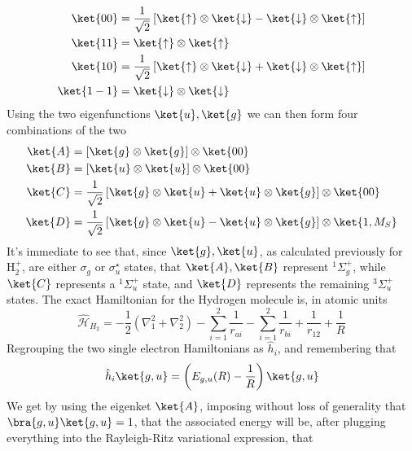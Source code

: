 \documentclass[a4paper, 11pt]{book}
\newcommand{\1}{\opr{\mathds{1}}}
\newcommand{\ham}{\mathcal{H}}
\newcommand{\opr}[1]{\hat{#1}}
\newcommand{\up}{\uparrow}
\newcommand{\down}{\downarrow}
\newcommand{\term}[3][]{^{#3}#2_{#1}}
\theoremstyle{plain}
\begin{document}
	\begin{equation}
		\begin{aligned}
			\ket{00}&=\frac{1}{\sqrt{2}}\left[ \ket{\up}\otimes\ket{\down}-\ket{\down}\otimes\ket{\up} \right]\\
			\ket{11}&=\ket{\up}\otimes\ket{\up}\\
			\ket{10}&=\frac{1}{\sqrt{2}}\left[ \ket{\up}\otimes\ket{\down}+\ket{\down}\otimes\ket{\up} \right]\\
			\ket{1-1}&=\ket{\down}\otimes\ket{\down}
		\end{aligned}
		\label{eq:eigenspinorsh2}
	\end{equation}
	Using the two eigenfunctions $\ket{u},\ket{g}$ we can then form four combinations of the two
	\begin{equation}
		\begin{aligned}
			\ket{A}&=\left[ \ket{g}\otimes\ket{g} \right]\otimes\ket{00}\\
			\ket{B}&=\left[ \ket{u}\otimes\ket{u} \right]\otimes\ket{00}\\
			\ket{C}&=\frac{1}{\sqrt{2}}\left[ \ket{g}\otimes\ket{u}+\ket{u}\otimes\ket{g} \right]\otimes\ket{00}\\
			\ket{D}&=\frac{1}{\sqrt{2}}\left[ \ket{g}\otimes\ket{u}-\ket{u}\otimes\ket{g} \right]\otimes\ket{1,M_S}
		\end{aligned}
		\label{eq:molecularspins}
	\end{equation}
	It's immediate to see that, since $\ket{g},\ket{u}$, as calculated previously for $\mathrm{H}_2^+$, are either $\sigma_g$ or $\sigma_u^{\star}$ states, that $\ket{A},\ket{B}$ represent $\term[g]{\Sigma^+}{1}$, while $\ket{C}$ represents a $\term[u]{\Sigma^+}{1}$ state, and $\ket{D}$ represents the remaining $\term[u]{\Sigma^+}{3}$ states.
	The exact Hamiltonian for the Hydrogen molecule is, in atomic units
	\begin{equation}
		\opr{\ham}_{H_2}=-\frac{1}{2}\left( \nabla^2_1+\nabla^2_2 \right)-\sum_{i=1}^2\frac{1}{r_{ai}}-\sum_{i=1}^2\frac{1}{r_{bi}}+\frac{1}{r_{12}}+\frac{1}{R}
		\label{eq:h2ham}
	\end{equation}
	Regrouping the two single electron Hamiltonians as $\opr{h}_i$, and remembering that
	\begin{equation*}
		\opr{h}_i\ket{g,u}=\left( E_{g,u}(R)-\frac{1}{R} \right)\ket{g,u}
	\end{equation*}
	We get by using the eigenket $\ket{A}$, imposing without loss of generality that $\bra{g,u}\ket{g,u}=1$, that the associated energy will be, after plugging everything into the Rayleigh-Ritz variational expression, that
\end{document}
